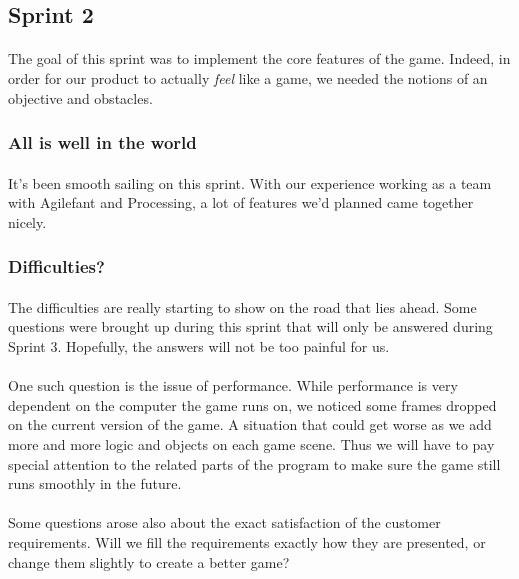 \subsection{Sprint 2}

\paragraph{} The goal of this sprint was to implement the core features of the game. Indeed, in order for our product to actually \emph{feel} like a game, we needed the notions of an objective and obstacles.

\subsubsection{All is well in the world}

\paragraph{} It's been smooth sailing on this sprint. With our experience working as a team with Agilefant and Processing, a lot of features we'd planned came together nicely.

\subsubsection{Difficulties?}

\paragraph{} The difficulties are really starting to show on the road that lies ahead. Some questions were brought up during this sprint that will only be answered during Sprint 3. Hopefully, the answers will not be too painful for us.

\paragraph{} One such question is the issue of performance. While performance is very dependent on the computer the game runs on, we noticed some frames dropped on the current version of the game. A situation that could get worse as we add more and more logic and objects on each game scene. Thus we will have to pay special attention to the related parts of the program to make sure the game still runs smoothly in the future.

\paragraph{} Some questions arose also about the exact satisfaction of the customer requirements. Will we fill the requirements exactly how they are presented, or change them slightly to create a better game?

